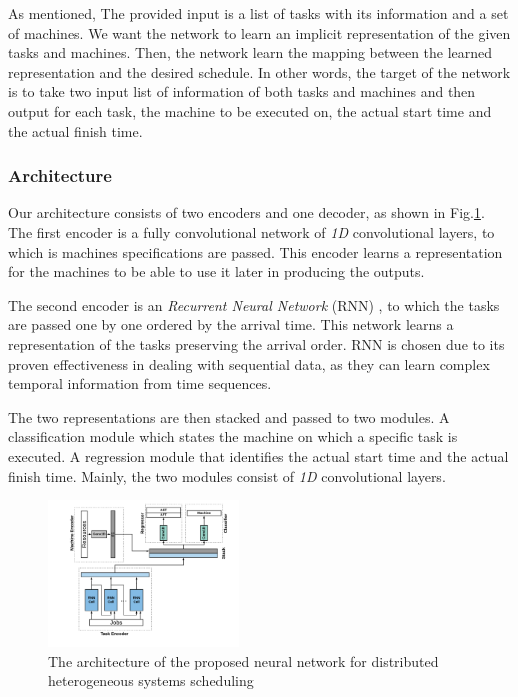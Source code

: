 \documentclass[twocolumn,11pt]{IEEEtran}
\begin{document}
As mentioned, The provided input is a list of tasks with its information and a set of machines. We want the network to learn an implicit representation of the given tasks and machines. Then, the network learn the mapping between the learned representation and the desired schedule. In other words, the target of the network is to take two input list of information of both tasks and machines and then output for each task, the machine to be executed on, the actual start time and the actual finish time. \\
    
\subsubsection{Architecture}
Our architecture consists of two encoders and one decoder, as shown in Fig.\ref{fig:nn}. \\
The first encoder is a fully convolutional network of \emph{1D} convolutional layers, to which is machines specifications are passed. This encoder learns a representation for the machines to be able to use it later in producing the outputs.

The second encoder is an \emph{Recurrent Neural Network} (RNN) \cite{chung2014empirical}, to which the tasks are passed one by one ordered by the arrival time. This network learns a representation of the tasks preserving the arrival order. RNN is chosen due to its proven effectiveness in dealing with sequential data, as they can learn complex temporal information from time sequences.

The two representations are then stacked and passed to two modules. A classification module which states the machine on which a specific task is executed. A regression module that identifies the actual start time and the actual finish time. Mainly, the two modules consist of \emph{1D} convolutional layers.

\begin{figure}[hp]
    \centering
    \includegraphics[width=0.45\textwidth]{sched_nn}
    \caption{The architecture of the proposed neural network for distributed heterogeneous systems scheduling}
    \label{fig:nn}
\end{figure}
    
\end{document}
